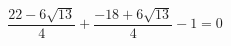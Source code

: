 \documentclass[preview]{standalone}
\begin{document}
\begin{align*}
\dfrac{22 - 6\sqrt{13} }{4}  + \dfrac{-18 + 6\sqrt{13} }{4}  -1 = 0
\end{align*}
\end{document}
